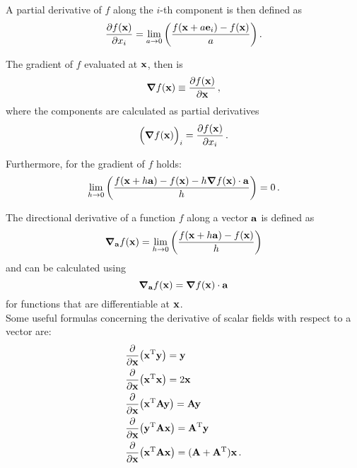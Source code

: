         A partial derivative of $f$ along the $i$-th component is then defined as
        \begin{equation}
            \pdv{f(\vb{x})}{x_i} = \lim_{a \to 0} \qty( \frac{f(\vb{x} + a \vb{e}_i) - f(\vb{x})}{a} ) \thinspace .
        \end{equation}

        The gradient of $f$ evaluated at $\vb{x}$, then is
        \begin{equation}
            \grad{f(\vb{x})} \equiv \pdv{f(\vb{x})}{\vb{x}} \thinspace ,
        \end{equation}
        where the components are calculated as partial derivatives
        \begin{equation}
            \Big( \grad{f(\vb{x})} \Big)_i = \pdv{f(\vb{x})}{x_i} \thinspace .
        \end{equation}

        Furthermore, for the gradient of $f$ holds:
        \begin{equation}
            \lim_{h \to 0} \qty( \frac{f(\vb{x} + h \vb{a}) - f(\vb{x}) - h \grad{f(\vb{x})} \cdot \vb{a}}{h} ) = 0 \thinspace .
        \end{equation}

        The directional derivative of a function $f$ along a vector $\vb{a}$ is defined as
        \begin{equation}
            \grad_{\vb{a}} f(\vb{x}) = \lim_{h \to 0} \qty( \frac{f(\vb{x} + h \vb{a}) - f(\vb{x})}{h} )
        \end{equation}
        and can be calculated using
        \begin{equation}
            \grad_{\vb{a}} f(\vb{x}) = \grad{f(\vb{x})} \cdot \vb{a}
        \end{equation}
        for functions that are differentiable at $\vb{x}$. \\

        Some useful formulas concerning the derivative of scalar fields with respect to a vector are:
        \begin{align}
            & \pdv{\vb{x}} (\vb{x}^\text{T} \vb{y}) = \vb{y} \\
            & \pdv{\vb{x}} (\vb{x}^\text{T} \vb{x}) = 2 \vb{x} \\
            & \pdv{\vb{x}} (\vb{x}^\text{T} \vb{A} \vb{y}) = \vb{A} \vb{y} \\
            & \pdv{\vb{x}} (\vb{y}^\text{T} \vb{A} \vb{x}) = \vb{A}^\text{T} \vb{y} \\
            & \pdv{\vb{x}} (\vb{x}^\text{T} \vb{A} \vb{x}) = (\vb{A} + \vb{A}^\text{T}) \vb{x} \thinspace .
        \end{align}

